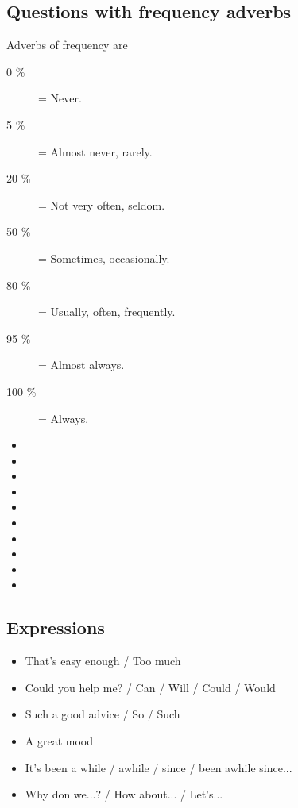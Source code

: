 \subsection{Questions with frequency adverbs}
\begin{multicols}{2}
Adverbs of frequency are
\begin{description}
\item[0 \%] = Never.
\item[5 \%] = Almost never, rarely.
\item[20 \%] = Not very often, seldom.
\item[50 \%] = Sometimes, occasionally.
\item[80 \%] = Usually, often, frequently.
\item[95 \%] = Almost always.
\item[100 \%] = Always.
\end{description}
\begin{itemize}
\item 
\item 
\item 
\item 
\item 
\item 
\item 
\item 
\item 
\item 
\end{itemize}
\end{multicols}

\subsection{Expressions}
\begin{multicols}{2}
\begin{itemize}
\item That's easy enough / Too much
\item Could you help me? / Can / Will / Could / Would
\item Such a good advice / So / Such
\item A great mood
\item It's been a while / awhile / since / been awhile since...
\item Why don we...? / How about... / Let's...
\end{itemize}
\end{multicols}

